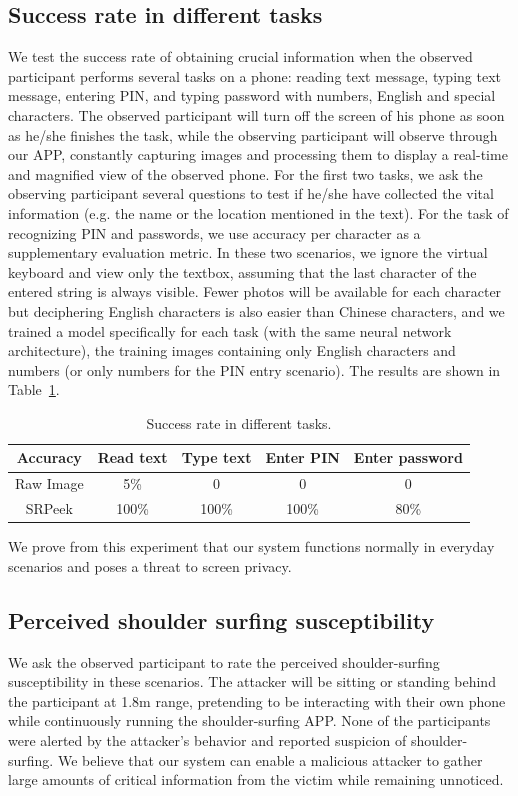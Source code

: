 \subsection{Success rate in different tasks}
We test the success rate of obtaining crucial information when the observed participant performs several tasks on a phone: reading text message, typing text message, entering PIN, and typing password with numbers, English and special characters. The observed participant will turn off the screen of his phone as soon as he/she finishes the task, while the observing participant will observe through our APP, constantly capturing images and processing them to display a real-time and magnified view of the observed phone. For the first two tasks, we ask the observing participant several questions to test if he/she have collected the vital information (e.g. the name or the location mentioned in the text). For the task of recognizing PIN and passwords, we use accuracy per character as a supplementary evaluation metric. In these two scenarios, we ignore the virtual keyboard and view only the textbox, assuming that the last character of the entered string is always visible. Fewer photos will be available for each character but deciphering English characters is also easier than Chinese characters, and we trained a model specifically for each task (with the same neural network architecture), the training images containing only English characters and numbers (or only numbers for the PIN entry scenario). The results are shown in Table~\ref{table-task}.

\begin{table}[!t]
\centering
\caption{Success rate in different tasks.}
\label{table-task}
\begin{tabular}{@{}ccccc@{}}
	\toprule
Accuracy & Read text & Type text & Enter PIN & Enter password\\ \midrule
Raw Image & 5\% & 0 & 0 & 0\\
SRPeek & 100\% & 100\% & 100\% & 80\%\\ \bottomrule
\end{tabular}

\end{table}

We prove from this experiment that our system functions normally in everyday scenarios and poses a threat to screen privacy.

\subsection{Perceived shoulder surfing susceptibility}
We ask the observed participant to rate the perceived shoulder-surfing susceptibility in these scenarios. The attacker will be sitting or standing behind the participant at 1.8m range, pretending to be interacting with their own phone while continuously running the shoulder-surfing APP. None of the participants were alerted by the attacker's behavior and reported suspicion of shoulder-surfing. We believe that our system can enable a malicious attacker to gather large amounts of critical information from the victim while remaining unnoticed.




